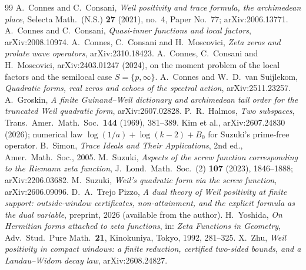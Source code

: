 \documentclass[11pt]{amsart}
\theoremstyle{definition}
\theoremstyle{remark}
\begin{document}
\begingroup\small
\begin{thebibliography}{99}
 A.~Connes and C.~Consani, \emph{Weil positivity and trace formula, the archimedean place}, Selecta Math.\ (N.S.) \textbf{27} (2021), no.~4, Paper No.~77; arXiv:2006.13771.
 A.~Connes and C.~Consani, \emph{Quasi-inner functions and local factors}, arXiv:2008.10974.
 A.~Connes, C.~Consani and H.~Moscovici, \emph{Zeta zeros and prolate wave operators}, arXiv:2310.18423.
 A.~Connes, C.~Consani and H.~Moscovici, arXiv:2403.01247 (2024), on the moment problem of the local factors and the semilocal case $S=\{p,\infty\}$.
 A.~Connes and W.~D.~van Suijlekom, \emph{Quadratic forms, real zeros and echoes of the spectral action}, arXiv:2511.23257.
 A.~Groskin, \emph{A finite Guinand--Weil dictionary and archimedean tail order for the truncated Weil quadratic form}, arXiv:2607.02828.
 P.~R.~Halmos, \emph{Two subspaces}, Trans.\ Amer.\ Math.\ Soc.\ \textbf{144} (1969), 381--389.
 Kim et al., arXiv:2607.24830 (2026); numerical law $\log(1/a)+\log(k-2)+B_0$ for Suzuki's prime-free operator.
 B.~Simon, \emph{Trace Ideals and Their Applications}, 2nd ed., Amer.\ Math.\ Soc., 2005.
 M.~Suzuki, \emph{Aspects of the screw function corresponding to the Riemann zeta function}, J.~Lond.\ Math.\ Soc.\ (2) \textbf{107} (2023), 1846--1888; arXiv:2206.03682.
 M.~Suzuki, \emph{Weil's quadratic form via the screw function}, arXiv:2606.09096.
 D.~A.~Trejo Pizzo, \emph{A dual theory of Weil positivity at finite support: outside-window certificates, non-attainment, and the explicit formula as the dual variable}, preprint, 2026 (available from the author).
 H.~Yoshida, \emph{On Hermitian forms attached to zeta functions}, in: \emph{Zeta Functions in Geometry}, Adv.\ Stud.\ Pure Math.\ \textbf{21}, Kinokuniya, Tokyo, 1992, 281--325.
 X.~Zhu, \emph{Weil positivity in compact windows: a finite reduction, certified two-sided bounds, and a Landau--Widom decay law}, arXiv:2608.24827.
\end{thebibliography}
\endgroup
\end{document}
